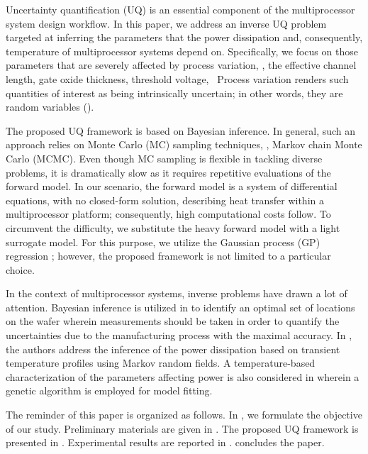 Uncertainty quantification (UQ) is an essential component of the multiprocessor system design workflow. In this paper, we address an inverse UQ problem targeted at inferring the parameters that the power dissipation and, consequently, temperature of multiprocessor systems depend on. Specifically, we focus on those parameters that are severely affected by process variation, \eg, the effective channel length, gate oxide thickness, threshold voltage, \etc\ Process variation renders such quantities of interest as being intrinsically uncertain; in other words, they are random variables (\rvs).

The proposed UQ framework is based on Bayesian inference. In general, such an approach relies on Monte Carlo (MC) sampling techniques, \eg, Markov chain Monte Carlo (MCMC). Even though MC sampling is flexible in tackling diverse problems, it is dramatically slow as it requires repetitive evaluations of the forward model. In our scenario, the forward model is a system of differential equations, with no closed-form solution, describing heat transfer within a multiprocessor platform; consequently, high computational costs follow. To circumvent the difficulty, we substitute the heavy forward model with a light surrogate model. For this purpose, we utilize the Gaussian process (GP) regression \cite{rasmussen2006}; however, the proposed framework is not limited to a particular choice.

In the context of multiprocessor systems, inverse problems have drawn a lot of attention. Bayesian inference is utilized in \cite{zhang2010} to identify an optimal set of locations on the wafer wherein measurements should be taken in order to quantify the uncertainties due to the manufacturing process with the maximal accuracy. In \cite{paek2012}, the authors address the inference of the power dissipation based on transient temperature profiles using Markov random fields. A temperature-based characterization of the parameters affecting power is also considered in \cite{mesa-martinez2007} wherein a genetic algorithm is employed for model fitting.

The reminder of this paper is organized as follows. In , we formulate the objective of our study. Preliminary materials are given in . The proposed UQ framework is presented in . Experimental results are reported in .  concludes the paper.
